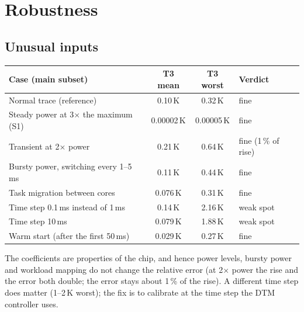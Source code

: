 \documentclass[11pt,a4paper]{article}
\begin{document}
\section{Robustness}

\subsection{Unusual inputs}
\begin{center}
\small
\begin{tabular}{@{}l c c l@{}}
\toprule
Case (main subset) & T3 mean & T3 worst & Verdict \\
\midrule
Normal trace (reference) & 0.10\,K & 0.32\,K & fine \\
Steady power at 3$\times$ the maximum (S1) & 0.00002\,K & 0.00005\,K & fine \\
Transient at 2$\times$ power & 0.21\,K & 0.64\,K & fine (1\,\% of rise) \\
Bursty power, switching every 1--5\,ms & 0.11\,K & 0.44\,K & fine \\
Task migration between cores & 0.076\,K & 0.31\,K & fine \\
Time step 0.1\,ms instead of 1\,ms & 0.14\,K & 2.16\,K & weak spot \\
Time step 10\,ms & 0.079\,K & 1.88\,K & weak spot \\
Warm start (after the first 50\,ms) & 0.029\,K & 0.27\,K & fine \\
\bottomrule
\end{tabular}
\end{center}
The coefficients are properties of the chip, and hence power levels, bursty power and workload
mapping do not change the relative error (at 2$\times$ power the rise and the error both double;
the error stays about 1\,\% of the rise). A different time step does matter (1--2\,K worst); the
fix is to calibrate at the time step the DTM controller uses.
\end{document}
